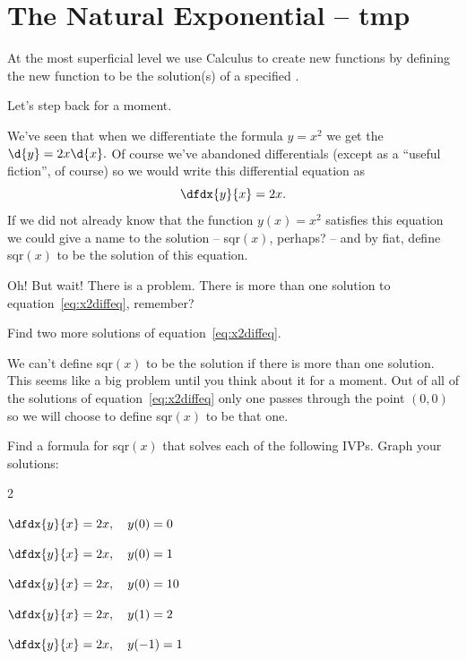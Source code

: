 \section{The Natural Exponential -- tmp}
\label{sec:exponential}

At the most superficial level we use Calculus to create new functions
by defining the new function to be the solution(s) of a specified
.

Let's step back for a moment.

We've seen that when we differentiate
the formula $y=x^2$ we get the  $\d{y} =
2x\d{x}.$ Of course we've abandoned differentials (except as a
``useful fiction'', of course) so we would write this differential
equation as
\begin{equation}
\dfdx{y}{x}=2x.\label{eq:x2diffeq}
\end{equation}
If we did not already know that the function $y(x)=x^2$ satisfies this equation we
could give a name to the solution -- sqr$(x)$, perhaps? --
and by fiat, \alert{define} sqr$(x)$ to be the solution of this
equation.

Oh! But wait! There is a problem. There is more than one solution to
equation~\ref{eq:x2diffeq}, remember?
\begin{ProficiencyDrill}
  Find two more solutions of equation~\ref{eq:x2diffeq}.
\end{ProficiencyDrill}
We can't define sqr$(x)$ to  be
\alert{the} solution if there is more than one solution. This seems
like a big problem until you think about it for a moment. Out of all of
the solutions  of equation~\ref{eq:x2diffeq} only one passes through
the point $(0,0)$ so we will choose to define sqr$(x)$ to be that one.
\begin{ProficiencyDrill}
  Find a formula for sqr$(x)$ that solves each of the following
  IVPs. Graph your solutions:
  \begin{enumerate}[label={\bf{}(\alph*)}]
    \begin{multicols}{2}
    \item $\dfdx{y}{x}=2x,\ \ \ y(0)=0$
    \item $\dfdx{y}{x}=2x,\ \ \ y(0)=1$
    \item $\dfdx{y}{x}=2x,\ \ \ y(0)=10$
    \item $\dfdx{y}{x}=2x,\ \ \ y(1)=2$
    \item $\dfdx{y}{x}=2x,\ \ \ y(-1)=1$
    \end{multicols}
  \end{enumerate}
\end{ProficiencyDrill}

